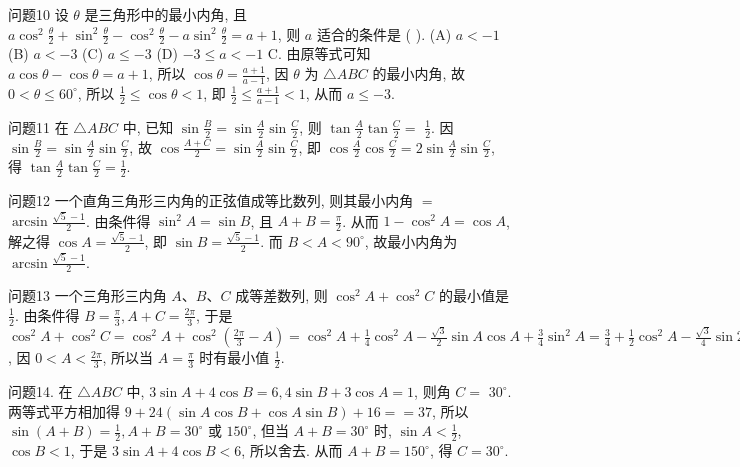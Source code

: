 问题10 设 $\theta$ 是三角形中的最小内角, 且 $a \cos ^2 \frac{\theta}{2}+\sin ^2 \frac{\theta}{2}-\cos ^2 \frac{\theta}{2}-a \sin ^2 \frac{\theta}{2}= a+1$, 则 $a$ 适合的条件是 ( ).
(A) $a<-1$
(B) $a<-3$
(C) $a \leqslant-3$
(D) $-3 \leqslant a<-1$
C. 由原等式可知 $a \cos \theta-\cos \theta=a+1$, 所以 $\cos \theta=\frac{a+1}{a-1}$, 因 $\theta$ 为 $\triangle A B C$ 的最小内角, 故 $0<\theta \leqslant 60^{\circ}$, 所以 $\frac{1}{2} \leqslant \cos \theta<1$, 即 $\frac{1}{2} \leqslant \frac{a+1}{a-1}<1$, 从而 $a \leqslant-3$.



问题11 在 $\triangle A B C$ 中, 已知 $\sin \frac{B}{2}=\sin \frac{A}{2} \sin \frac{C}{2}$, 则 $\tan \frac{A}{2} \tan \frac{C}{2}=$
$\frac{1}{2}$. 因 $\sin \frac{B}{2}=\sin \frac{A}{2} \sin \frac{C}{2}$, 故 $\cos \frac{A+C}{2}=\sin \frac{A}{2} \sin \frac{C}{2}$, 即 $\cos \frac{A}{2} \cos \frac{C}{2}=2 \sin \frac{A}{2} \sin \frac{C}{2}$, 得 $\tan \frac{A}{2} \tan \frac{C}{2}=\frac{1}{2}$.



问题12 一个直角三角形三内角的正弦值成等比数列, 则其最小内角 $=$
$\arcsin \frac{\sqrt{5}-1}{2}$. 由条件得 $\sin ^2 A=\sin B$, 且 $A+B=\frac{\pi}{2}$. 从而 $1- \cos ^2 A=\cos A$, 解之得 $\cos A=\frac{\sqrt{5}-1}{2}$, 即 $\sin B=\frac{\sqrt{5}-1}{2}$. 而 $B<A<90^{\circ}$, 故最小内角为 $\arcsin \frac{\sqrt{5}-1}{2}$.



问题13 一个三角形三内角 $A 、 B 、 C$ 成等差数列, 则 $\cos ^2 A+\cos ^2 C$ 的最小值是
$\frac{1}{2}$. 由条件得 $B=\frac{\pi}{3}, A+C=\frac{2 \pi}{3}$, 于是 $\cos ^2 A+\cos ^2 C=\cos ^2 A+ \cos ^2\left(\frac{2 \pi}{3}-A\right)=\cos ^2 A+\frac{1}{4} \cos ^2 A-\frac{\sqrt{3}}{2} \sin A \cos A+\frac{3}{4} \sin ^2 A=\frac{3}{4}+\frac{1}{2} \cos ^2 A- \frac{\sqrt{3}}{4} \sin 2 A=\frac{3}{4}+\frac{1}{4}(\cos 2 A+1)-\frac{\sqrt{3}}{4} \sin 2 A=1-\frac{1}{2} \sin \left(2 A-\frac{\pi}{6}\right)$, 因 $0< A<\frac{2 \pi}{3}$, 所以当 $A=\frac{\pi}{3}$ 时有最小值 $\frac{1}{2}$.



问题14. 在 $\triangle A B C$ 中, $3 \sin A+4 \cos B=6,4 \sin B+3 \cos A=1$, 则角 $C=$
$30^{\circ}$. 两等式平方相加得 $9+24(\sin A \cos B+\cos A \sin B)+16==37$, 所以 $\sin (A+B)=\frac{1}{2}, A+B=30^{\circ}$ 或 $150^{\circ}$, 但当 $A+B=30^{\circ}$ 时, $\sin A<\frac{1}{2}$, $\cos B<1$, 于是 $3 \sin A+4 \cos B<6$, 所以舍去.
从而 $A+B=150^{\circ}$, 得 $C=30^{\circ}$.



